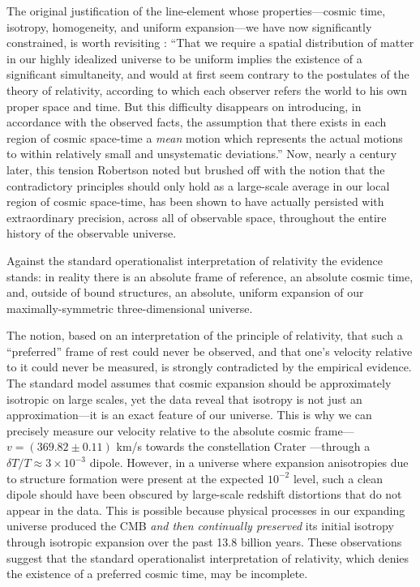 \documentclass[aps,prd,reprint,superscriptaddress]{revtex4-2}
\begin{document}
The original justification of the line-element whose properties---cosmic time, isotropy, homogeneity, and uniform expansion---we have now significantly constrained, is worth revisiting \cite{Robertson1933}: ``That we require a spatial distribution of matter in our highly idealized universe to be uniform implies the existence of a significant simultaneity, and would at first seem contrary to the postulates of the theory of relativity, according to which each observer refers the world to his own proper space and time. But this difficulty disappears on introducing, in accordance with the observed facts, the assumption that there exists in each region of cosmic space-time a \textit{mean} motion which represents the actual motions to within relatively small and unsystematic deviations.'' Now, nearly a century later, this tension Robertson noted but brushed off with the notion that the contradictory principles should only hold as a large-scale average in our local region of cosmic space-time, has been shown to have actually persisted with extraordinary precision, across all of observable space, throughout the entire history of the observable universe.

Against the standard operationalist interpretation of relativity the evidence stands: in reality there is an absolute frame of reference, an absolute cosmic time, and, outside of bound structures, an absolute, uniform expansion of our maximally-symmetric three-dimensional universe. 

The notion, based on an interpretation of the principle of relativity, that such a ``preferred'' frame of rest could never be observed, and that one's velocity relative to it could never be measured, is strongly contradicted by the empirical evidence. The standard model assumes that cosmic expansion should be approximately isotropic on large scales, yet the data reveal that isotropy is not just an approximation---it is an exact feature of our universe. This is why we can precisely measure our velocity relative to the absolute cosmic frame---$v=(369.82\pm0.11)$ km/s towards the constellation Crater \cite{Aghanim2020a}---through a $\delta T/T \approx 3 \times 10^{-3}$ dipole. However, in a universe where expansion anisotropies due to structure formation were present at the expected $10^{-2}$ level, such a clean dipole should have been obscured by large-scale redshift distortions that do not appear in the data. This is possible because physical processes in our expanding universe produced the CMB \textit{and then continually preserved} its initial isotropy through isotropic expansion over the past 13.8 billion years. These observations suggest that the standard operationalist interpretation of relativity, which denies the existence of a preferred cosmic time, may be incomplete. 
\end{document}
